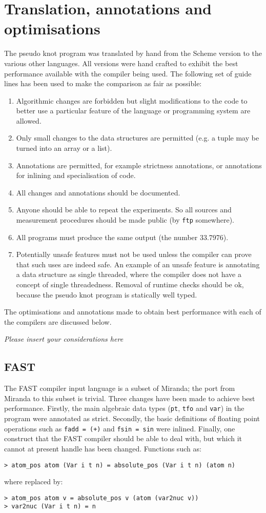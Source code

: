 \section{Translation, annotations and optimisations}
The pseudo knot program was translated by hand from the Scheme version
to the various other languages. All versions were hand crafted to
exhibit the best performance available with the compiler being used.
The following set of guide lines has been used to make the comparison
as fair as possible:
\begin{enumerate}
\item
Algorithmic changes are forbidden but slight modifications to the code
to better use a particular feature of the language or programming
system are allowed.
\item
Only small changes to the data structures are permitted (e.g. a tuple
may be turned into an array or a list).
\item
Annotations are permitted, for example strictness annotations, or
annotations for inlining and specialisation of code.
\item
All changes and annotations should be documented.
\item
Anyone should be able to repeat the experiments. So all sources and
measurement procedures should be made public (by \verb=ftp= somewhere).
\item
All programs must produce the same output (the number 33.7976).
\item
Potentially unsafe features must not be used unless the compiler can
prove that such uses are indeed safe. An example of an unsafe feature
is annotating a data structure as single threaded, where the compiler
does not have a concept of single threadedness. Removal of runtime
checks should be ok, because the pseudo knot program is statically well
typed.
\end{enumerate}

The optimisations and annotations made to obtain best performance with
each of the compilers are discussed below.

{\em Please insert your considerations here}

\subsection{FAST}
The FAST compiler input language is a subset of Miranda; the port from
Miranda to this subset is trivial. Three changes have been made to
achieve best performance. Firstly, the main algebraic data types
(\verb=pt=, \verb=tfo= and \verb=var=) in the program were annotated as
strict. Secondly, the basic definitions of floating point operations
such as \verb|fadd = (+)| and \verb|fsin = sin| were inlined. Finally,
one construct that the FAST compiler should be able to deal with, but
which it cannot at present handle has been changed.
Functions such as:
\begin{verbatim}
> atom_pos atom (Var i t n) = absolute_pos (Var i t n) (atom n)
\end{verbatim}
where replaced by:
\begin{verbatim}
> atom_pos atom v = absolute_pos v (atom (var2nuc v))
> var2nuc (Var i t n) = n
\end{verbatim}


